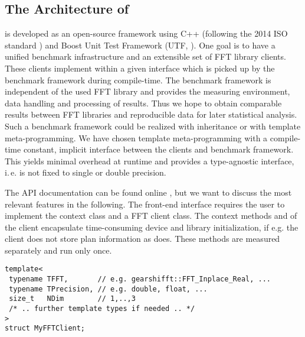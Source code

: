 \subsection{The Architecture of \gearshifft{}}
\label{ssec:gearshifft_arch}
\gearshifft{} is developed as an open-source framework using C++ (following the 2014 ISO standard \cite{cpp14std}) and Boost Unit Test Framework (UTF, \cite{boost}). %
One goal is to have a unified benchmark infrastructure and an extensible set of FFT library clients. 
These clients implement within \gearshifft{} a given interface which is picked up by the benchmark framework during compile-time. 
The benchmark framework is independent of the used FFT library and provides the measuring environment, data handling and processing of results.
Thus we hope to obtain comparable results between FFT libraries and reproducible data for later statistical analysis.
Such a benchmark framework could be realized with inheritance or with template meta-programming. 
We have chosen template meta-programming with a compile-time constant, implicit interface between the clients and benchmark framework.
This yields minimal overhead at runtime and provides a type-agnostic interface, i.\,e. \gearshifft{} is not fixed to single or double precision.


The API documentation can be found online \cite{gearshifft_github}, but we want to discuss the most relevant features in the following. The front-end interface requires the user to implement the context class and a FFT client class. The context methods  and  of the client encapsulate time-consuming device and library initialization, if e.g. the client does not store plan information as \fftw{} does. These methods are measured separately and run only once. 

\begin{lstlisting}[caption={Required template arguments for FFT client implementation},label={lst:implfft_templ}]
template<
 typename TFFT,       // e.g. gearshifft::FFT_Inplace_Real, ...
 typename TPrecision, // e.g. double, float, ...
 size_t   NDim        // 1,..,3
 /* .. further template types if needed .. */
>
struct MyFFTClient;
\end{lstlisting}

